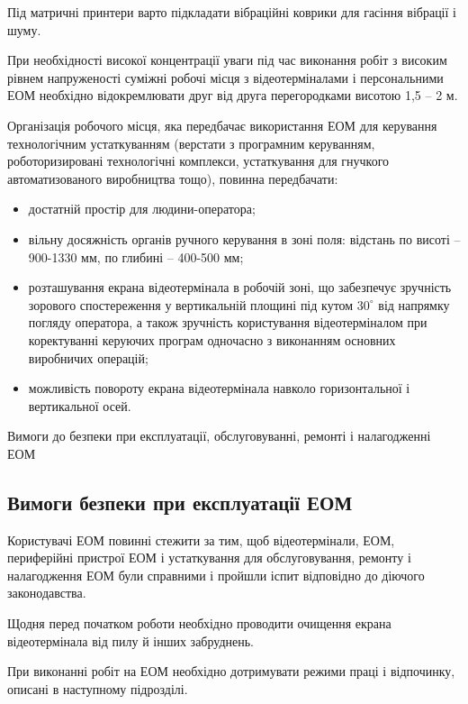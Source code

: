 \documentclass[simple,a4paper,14pt,ukrainian,utf8]{eskdtext}
\begin{document}
\begin{appendices}
                Під матричні принтери варто підкладати вібраційні коврики для гасіння вібрації і шуму.

                При необхідності високої концентрації уваги під час виконання робіт з високим рівнем напруженості суміжні робочі місця з відеотерміналами і персональними ЕОМ необхідно відокремлювати друг від друга перегородками висотою 1,5 -- 2 м.

                Організація робочого місця, яка передбачає використання ЕОМ для керування технологічним устаткуванням (верстати з програмним керуванням, роботоризировані технологічні комплекси, устаткування для гнучкого автоматизованого виробництва тощо), повинна передбачати:

                \begin{itemize}
                    \item достатній простір для людини-оператора;
                    \item вільну досяжність органів ручного керування в зоні поля: відстань по висоті -- 900-1330 мм, по глибині -- 400-500 мм;
                    \item розташування екрана відеотермінала в робочій зоні, що забезпечує зручність зорового спостереження у вертикальній площині під кутом $30^{\circ}$ від напрямку погляду оператора, а також зручність користування відеотерміналом при коректуванні керуючих програм одночасно з виконанням основних виробничих операцій;
                    \item можливість повороту екрана відеотермінала навколо горизонтальної і вертикальної осей.
                \end{itemize}

                Вимоги до безпеки при експлуатації, обслуговуванні, ремонті і налагодженні ЕОМ

            \subsection{Вимоги безпеки при експлуатації ЕОМ}

                Користувачі ЕОМ повинні стежити за тим, щоб відеотермінали, ЕОМ, периферійні пристрої ЕОМ і устаткування для обслуговування, ремонту і налагодження ЕОМ були справними і пройшли іспит відповідно до діючого законодавства.

                Щодня перед початком роботи необхідно проводити очищення екрана відеотермінала від пилу й інших забруднень.

                При виконанні робіт на ЕОМ необхідно дотримувати режими праці і відпочинку, описані в наступному підрозділі.


\end{appendices}
\end{document}
